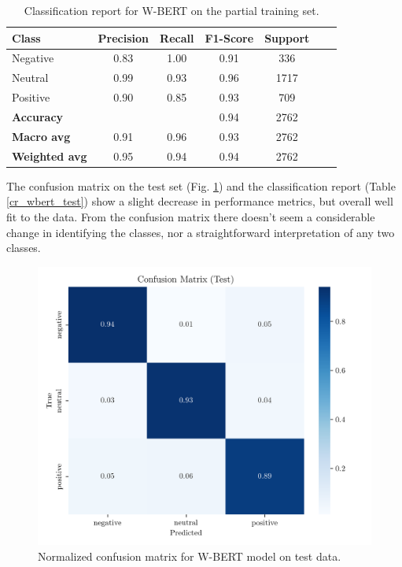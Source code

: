 \documentclass[conference]{IEEEtran}
\begin{document}
\begin{table}[H]
\centering
\caption{Classification report for W-BERT on the partial training set.}
\label{cr_weightbert_train}
\begin{tabular}{lcccccc}
\toprule
\textbf{Class} & \textbf{Precision} & \textbf{Recall} & \textbf{F1-Score} & \textbf{Support} \\
\midrule
Negative & 0.83 & 1.00 & 0.91 & 336 \\
Neutral & 0.99 & 0.93 & 0.96 & 1717 \\
Positive & 0.90 & 0.85 & 0.93 & 709 \\
\midrule
\textbf{Accuracy} &  &  & 0.94 & 2762 \\
\textbf{Macro avg} & 0.91 & 0.96 & 0.93 & 2762 \\
\textbf{Weighted avg} & 0.95 & 0.94 & 0.94 & 2762 \\
\bottomrule
\end{tabular}
\end{table}

The confusion matrix on the test set (Fig. \ref{fig:weighted_bert_confusion_matrix_Test}) and the classification report (Table \ref{cr_wbert_test}) show a slight decrease in performance metrics, but overall well fit to the data. From the confusion matrix there doesn't seem a considerable change in identifying the classes, nor a straightforward interpretation of any two classes.

\begin{figure}[H]
    \centering
    \includegraphics[width=1\linewidth]{assets/weighted_bert_confusion_matrix_Test.png}
    \caption{Normalized confusion matrix for W-BERT model on test data.}
    \label{fig:weighted_bert_confusion_matrix_Test}
\end{figure}
\end{document}
